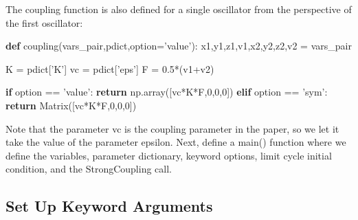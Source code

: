 \documentclass[english,a4paper,oneside]{article}
\newenvironment{Shaded}{}{}
\newcommand{\ControlFlowTok}[1]{\textcolor[rgb]{0.00,0.44,0.13}{\textbf{#1}}}
\newcommand{\DecValTok}[1]{\textcolor[rgb]{0.25,0.63,0.44}{#1}}
\newcommand{\FloatTok}[1]{\textcolor[rgb]{0.25,0.63,0.44}{#1}}
\newcommand{\KeywordTok}[1]{\textcolor[rgb]{0.00,0.44,0.13}{\textbf{#1}}}
\newcommand{\NormalTok}[1]{#1}
\newcommand{\OperatorTok}[1]{\textcolor[rgb]{0.40,0.40,0.40}{#1}}
\newcommand{\StringTok}[1]{\textcolor[rgb]{0.25,0.44,0.63}{#1}}
\begin{document}
The coupling function is also defined for a single oscillator from the
perspective of the first oscillator:

\begin{Shaded}
\begin{Highlighting}[]
\KeywordTok{def}\NormalTok{ coupling(vars_pair,pdict,option}\OperatorTok{=}\StringTok{'value'}\NormalTok{):}
\NormalTok{    x1,y1,z1,v1,x2,y2,z2,v2 }\OperatorTok{=}\NormalTok{ vars_pair}
    
\NormalTok{    K }\OperatorTok{=}\NormalTok{ pdict[}\StringTok{'K'}\NormalTok{]}
\NormalTok{    vc }\OperatorTok{=}\NormalTok{ pdict[}\StringTok{'eps'}\NormalTok{]}
\NormalTok{    F }\OperatorTok{=} \FloatTok{0.5}\OperatorTok{*}\NormalTok{(v1}\OperatorTok{+}\NormalTok{v2)}
    
    \ControlFlowTok{if}\NormalTok{ option }\OperatorTok{==} \StringTok{'value'}\NormalTok{:}
        \ControlFlowTok{return}\NormalTok{ np.array([vc}\OperatorTok{*}\NormalTok{K}\OperatorTok{*}\NormalTok{F,}\DecValTok{0}\NormalTok{,}\DecValTok{0}\NormalTok{,}\DecValTok{0}\NormalTok{])}
    \ControlFlowTok{elif}\NormalTok{ option }\OperatorTok{==} \StringTok{'sym'}\NormalTok{:}
        \ControlFlowTok{return}\NormalTok{ Matrix([vc}\OperatorTok{*}\NormalTok{K}\OperatorTok{*}\NormalTok{F,}\DecValTok{0}\NormalTok{,}\DecValTok{0}\NormalTok{,}\DecValTok{0}\NormalTok{])}
\end{Highlighting}
\end{Shaded}

Note that the parameter vc is the coupling parameter in the paper, so we
let it take the value of the parameter epsilon. Next, define a main()
function where we define the variables, parameter dictionary, keyword
options, limit cycle initial condition, and the StrongCoupling call.

\hypertarget{set-up-keyword-arguments}{%
\subsection{Set Up Keyword Arguments}\label{set-up-keyword-arguments}}
\end{document}
